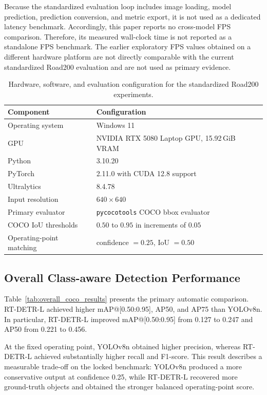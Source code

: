 \documentclass[runningheads]{llncs}
\begin{document}
Because the standardized evaluation loop includes image loading, model prediction, prediction conversion, and metric export, it is not used as a dedicated latency benchmark. Accordingly, this paper reports no cross-model FPS comparison. Therefore, its measured wall-clock time is not reported as a standalone FPS benchmark. The earlier exploratory FPS values obtained on a different hardware platform are not directly comparable with the current standardized Road200 evaluation and are not used as primary evidence.

\begin{table}[H]
\caption{Hardware, software, and evaluation configuration for the standardized Road200 experiments.}
\label{tab:experimental_setup}
\centering
\small
\begin{tabular}{ll}
\hline
Component & Configuration \\
\hline
Operating system & Windows 11 \\
GPU & NVIDIA RTX 5080 Laptop GPU, 15.92\,GiB VRAM \\
Python & 3.10.20 \\
PyTorch & 2.11.0 with CUDA 12.8 support \\
Ultralytics & 8.4.78 \\
Input resolution & $640 \times 640$ \\
Primary evaluator & \texttt{pycocotools} COCO bbox evaluator \\
COCO IoU thresholds & $0.50$ to $0.95$ in increments of $0.05$ \\
Operating-point matching & confidence $=0.25$, IoU $=0.50$ \\
\hline
\end{tabular}
\end{table}

\subsection{Overall Class-aware Detection Performance}

Table~\ref{tab:overall_coco_results} presents the primary automatic comparison. RT-DETR-L achieved higher mAP@[0.50:0.95], AP50, and AP75 than YOLOv8n. In particular, RT-DETR-L improved mAP@[0.50:0.95] from 0.127 to 0.247 and AP50 from 0.221 to 0.456.

At the fixed operating point, YOLOv8n obtained higher precision, whereas RT-DETR-L achieved substantially higher recall and F1-score. This result describes a measurable trade-off on the locked benchmark: YOLOv8n produced a more conservative output at confidence 0.25, while RT-DETR-L recovered more ground-truth objects and obtained the stronger balanced operating-point score.
\end{document}
